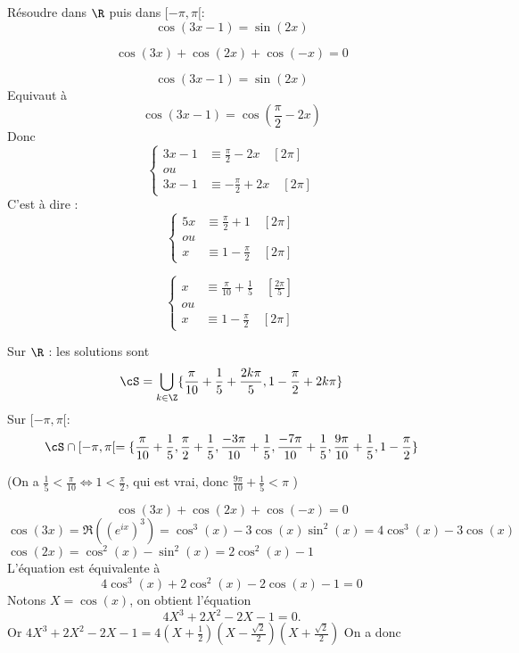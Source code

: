 




\begin{exercice}
Résoudre dans $\R$ puis dans $[-\pi, \pi[$:
\begin{equation}
\cos(3x-1)=\sin(2x)
\end{equation}


\begin{equation}
\cos(3x)+\cos(2x)+\cos(-x)=0
\end{equation}
\end{exercice}

\begin{correction}
$$\cos(3x-1)=\sin(2x)$$
Equivaut à 
$$\cos(3x-1)=\cos(\frac{\pi}{2}-2x)$$
Donc 
$$\left\{ \begin{array}{cc}
3x-1&\equiv \frac{\pi}{2}-2x\quad [2\pi]\\
ou &\\
3x-1&\equiv -\frac{\pi}{2}+2x\quad [2\pi]
\end{array}\right.$$
C'est à dire : 
$$\left\{ \begin{array}{cc}
5x&\equiv \frac{\pi}{2}+1\quad [2\pi]\\
ou &\\
x&\equiv 1-\frac{\pi}{2}\quad [2\pi]
\end{array}\right.$$

$$\left\{ \begin{array}{cc}
x&\equiv \frac{\pi}{10}+\frac{1}{5}\quad [\frac{2\pi}{5}]\\
ou &\\
x&\equiv 1-\frac{\pi}{2}\quad [2\pi]
\end{array}\right.$$






Sur $\R $ : les solutions sont $$\cS=\bigcup_{k\in \Z} \{ \frac{\pi}{10}+\frac{1}{5} + \frac{2k\pi}{5},1-\frac{\pi}{2}+2k\pi \}$$
Sur $[-\pi, \pi[$:
$$\cS\cap [-\pi, \pi[ = \{  \frac{\pi}{10}+\frac{1}{5},  \frac{\pi}{2}+\frac{1}{5} ,  \frac{-3\pi}{10}+\frac{1}{5},  \frac{-7\pi}{10}+\frac{1}{5} ,  \frac{9\pi}{10}+\frac{1}{5}, 1-\frac{\pi}{2}\}$$


(On a $\frac{1}{5}< \frac{\pi}{10} \Longleftrightarrow 1<\frac{\pi}{2} $, qui est vrai, donc $ \frac{9\pi}{10}+\frac{1}{5}<\pi$  )

\begin{equation}\tag{(2)}
\cos(3x)+\cos(2x)+\cos(-x)=0
\end{equation}
$\cos(3x) =\Re((e^{ix})^3)=\cos^3(x) -3\cos(x)\sin^2(x)=4\cos^3(x)-3\cos(x) $\\
$\cos(2x) = \cos^2(x)-\sin^2(x)=2\cos^2(x)-1$\\
L'équation est équivalente  à 
$$4\cos^3(x)+2\cos^2(x)-2\cos(x)-1=0$$
Notons $X=\cos(x)$, on obtient l'équation 
$$4X^3+2X^2-2X-1 =0.$$
Or $4X^3+2X^2-2X-1  =4(X+\frac{1}{2}) (X-\frac{\sqrt{2}}{2})(X+\frac{\sqrt{2}}{{2}})$
On a donc 


\end{correction}
